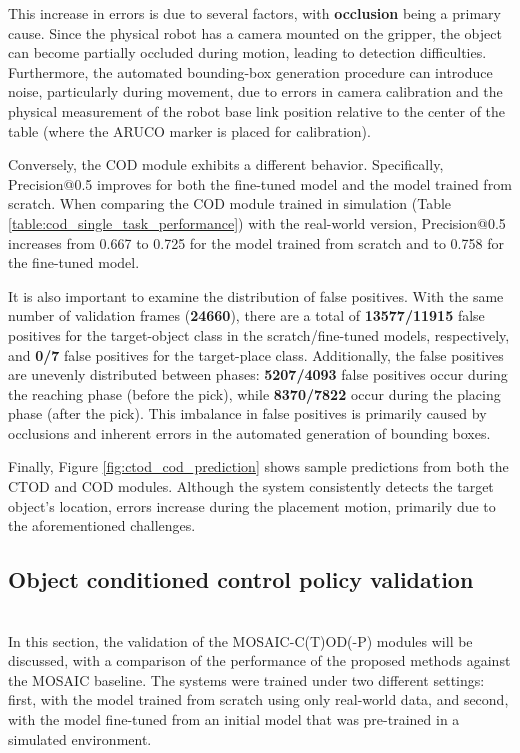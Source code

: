 This increase in errors is due to several factors, with \textbf{occlusion} being a primary cause. Since the physical robot has a camera mounted on the gripper, the object can become partially occluded during motion, leading to detection difficulties. Furthermore, the automated bounding-box generation procedure can introduce noise, particularly during movement, due to errors in camera calibration and the physical measurement of the robot base link position relative to the center of the table (where the ARUCO marker is placed for calibration).

Conversely, the COD module exhibits a different behavior. Specifically, Precision@0.5 improves for both the fine-tuned model and the model trained from scratch. When comparing the COD module trained in simulation (Table \ref{table:cod_single_task_performance}) with the real-world version, Precision@0.5 increases from 0.667 to 0.725 for the model trained from scratch and to 0.758 for the fine-tuned model.  

It is also important to examine the distribution of false positives. With the same number of validation frames (\textbf{24660}), there are a total of \textbf{13577/11915} false positives for the target-object class in the scratch/fine-tuned models, respectively, and \textbf{0/7} false positives for the target-place class. Additionally, the false positives are unevenly distributed between phases: \textbf{5207/4093} false positives occur during the reaching phase (before the pick), while \textbf{8370/7822} occur during the placing phase (after the pick). This imbalance in false positives is primarily caused by occlusions and inherent errors in the automated generation of bounding boxes.

Finally, Figure \ref{fig:ctod_cod_prediction} shows sample predictions from both the CTOD and COD modules. Although the system consistently detects the target object's location, errors increase during the placement motion, primarily due to the aforementioned challenges.




\subsection{Object conditioned control policy validation}\mbox{}\\
In this section, the validation of the MOSAIC-C(T)OD(-P) modules will be discussed, with a comparison of the performance of the proposed methods against the MOSAIC baseline. The systems were trained under two different settings: first, with the model trained from scratch using only real-world data, and second, with the model fine-tuned from an initial model that was pre-trained in a simulated environment.

